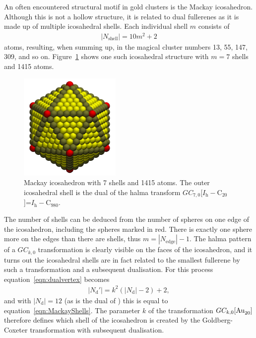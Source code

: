 An often encountered structural motif in gold clusters is the Mackay
icosahedron.\autocite{Nam2002,Wang-Wang-2011} Although this is not a hollow
structure, it is related to dual fullerenes as it is made up of multiple
icosahedral shells. Each individual shell $m$ consists of
%
\begin{align}
    |N_\text{shell}|=10m^2+2\label{eqn:MackayShells}
\end{align}
%
atoms, resulting, when summing up, in the magical cluster numbers 13, 55, 147, 309, and so
on.\autocite{Mackay-1962,Kuo_MackayAntiMackayDoubleMackay_2002}
Figure~\ref{fig:mackaylarge} shows one such icosahedral structure with $m=7$
shells and 1415 atoms.
%
\begin{figure}[htb]
    \begin{center}
    \includegraphics[width=4.9cm]{golddual/ico.jpg}
        \caption{Mackay icosahedron with 7 shells and 1415 atoms. The outer icosahedral shell is the dual of the halma transform $GC_{7,0}$[$I_\mathrm{h}-$C$_{20}$]=$I_\mathrm{h}-$C$_{980}$.}
    \label{fig:mackaylarge}
    \end{center}
\end{figure}
%
The number of shells can be deduced from the number of spheres on one edge of
the icosahedron,  including the spheres marked in red. There is exactly one
sphere more on the edges than there are shells, thus $m=|N_\text{edge}|-1$. The
halma pattern of a $GC_{k,0}$ transformation is clearly visible on the faces of
the icosahedron, and it turns out the icosahedral shells are in fact related to
the smallest fullerene  by such a transformation and a subsequent
dualisation. For this process equation~\eqref{eqn:dualvertex} becomes
%
\begin{align}
    |N_\text{d}'| = k^2(|N_\text{d}|-2) + 2,
\end{align}
%
and with $|N_\text{d}|=12$ (as  is the dual of ) this is equal
to equation~\eqref{eqn:MackayShells}. The parameter $k$ of the transformation
$GC_{k,0}[\ce{Au20}]$ therefore defines which shell of the icosahedron is
created by the Goldberg-Coxeter transformation with subsequent dualisation.

